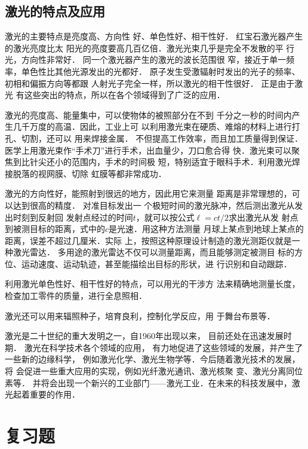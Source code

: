 \subsection{激光的特点及应用}

激光的主要特点是亮度高、方向性
好、单色性好、相干性好．
红宝石激光器产生的激光亮度比太
阳光的亮度要高几百亿倍．激光光束几乎是完全不发散的平
行光，方向性非常好．
同一个激光器产生的激光的波长范围很
窄，接近于单一频率，单色性比其他光源发出的光都好．
原子发生受激辐射时发出的光子的频率、初相和偏振方向等都跟
人射光子完全一样，所以激光的相干性很好．
正是由于激光
有这些突出的特点，所以在各个领域得到了广泛的应用．

激光的亮度高、能量集中，可以使物体的被照部分在不到
千分之一秒的时间内产生几千万度的高温．因此，工业上可
以利用激光束在硬质、难熔的材料上进行打孔、切割，还可以
用来焊接金属．
不但提高工作效率，而且加工质量得到保证．
医学上用激光束作“手术刀”进行手术，出血量少，刀口愈合得
快．激光束可以聚焦到比针尖还小的范围内，手术的时间极
短，特别适宜于眼科手术．利用激光焊接脱落的视网膜、切除
虹膜等都非常成功．

激光的方向性好，能照射到很远的地方，因此用它来测量
距离是非常理想的，可以达到很高的精度．
对准目标发出一
个极短时间的激光脉冲，然后测出激光从发出时刻到反射回
发射点经过的时间$t$，就可以按公式$\ell=ct/2$求出激光从发
射点到被测目标的距离，式中的$c$是光速．用这种方法测量
月球上某点到地球上某点的距离，误差不超过几厘米．实际
上，按照这种原理设计制造的激光测距仪就是一种激光雷达．
多用途的激光雷达不仅可以测量距离，而且能够测定被测目
标的方位、运动速度、运动轨迹，甚至能描绘出目标的形状，进
行识别和自动跟踪．

利用激光单色性好、相干性好的特点，可以用光的干涉方
法来精确地测量长度，检查加工零件的质量，进行全息照相．

激光还可以用来辐照种子，培育良利，控制化学反应，用
于舞台布景等．

激光是二十世纪的重大发明之一，自1960年出现以来，
目前还处在迅速发展时期．
激光在科学技术各个领域的应用，
有力地促进了这些领域的发展，并产生了一些新的边缘科学，
例如激光化学、激光生物学等．今后随着激光技术的发展，将
会促进一些重大应用的实现，例如光纤激光通讯、激光核聚
变、激光分离同位素等．
并将会出现一个新兴的工业部门——激光工业．在未来的科技发展中，激光起着重要的作用．

\section*{复习题}

